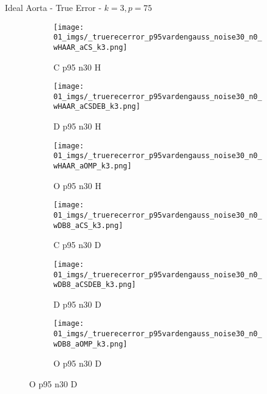 \begin{frame}{Ideal Aorta - True Error - $k=3,p=75$}{}
\begin{figure}
\begin{subfigure}{0.13\textwidth}
\texttt{[image: 01\_imgs/\_truerecerror\_p95vardengauss\_noise30\_n0\_wHAAR\_aCS\_k3.png]}
\caption*{\tiny C p95 n30 H}
\end{subfigure}
\begin{subfigure}{0.13\textwidth}
\texttt{[image: 01\_imgs/\_truerecerror\_p95vardengauss\_noise30\_n0\_wHAAR\_aCSDEB\_k3.png]}
\caption*{\tiny D p95 n30 H}
\end{subfigure}
\begin{subfigure}{0.13\textwidth}
\texttt{[image: 01\_imgs/\_truerecerror\_p95vardengauss\_noise30\_n0\_wHAAR\_aOMP\_k3.png]}
\caption*{\tiny O p95 n30 H}
\end{subfigure}
\begin{subfigure}{0.13\textwidth}
\texttt{[image: 01\_imgs/\_truerecerror\_p95vardengauss\_noise30\_n0\_wDB8\_aCS\_k3.png]}
\caption*{\tiny C p95 n30 D}
\end{subfigure}
\begin{subfigure}{0.13\textwidth}
\texttt{[image: 01\_imgs/\_truerecerror\_p95vardengauss\_noise30\_n0\_wDB8\_aCSDEB\_k3.png]}
\caption*{\tiny D p95 n30 D}
\end{subfigure}
\begin{subfigure}{0.13\textwidth}
\texttt{[image: 01\_imgs/\_truerecerror\_p95vardengauss\_noise30\_n0\_wDB8\_aOMP\_k3.png]}
\caption*{\tiny O p95 n30 D}
\end{subfigure}
\end{figure}
\end{frame}
